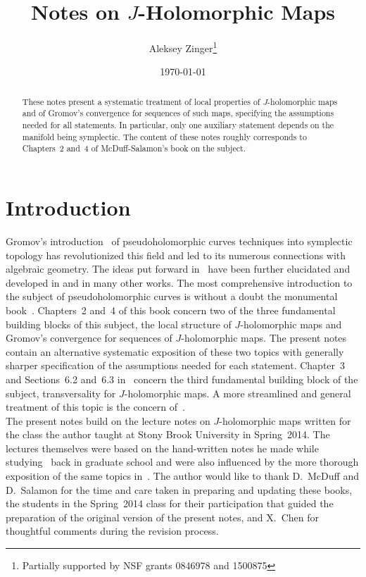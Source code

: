 \documentclass[11pt]{article}
\numberwithin{equation}{section}
\theoremstyle{definition}
\begin{document}
\title{Notes on $J$-Holomorphic Maps}
\author{Aleksey Zinger\thanks{Partially supported 
by NSF grants 0846978 and 1500875}}

\date{\today}

\maketitle

\begin{abstract}
\noindent
These notes present a systematic treatment of local properties of $J$-holomorphic maps
and of Gromov's convergence for sequences of such maps,
specifying the assumptions needed for all statements.
In particular, only one auxiliary statement depends on the manifold being symplectic. 
The content of these notes roughly corresponds to Chapters~2 and~4
of McDuff-Salamon's book on the subject.
\end{abstract}


\tableofcontents



\section{Introduction}
\label{intro_sec}

\noindent
Gromov's introduction~\cite{Gr} of pseudoholomorphic curves techniques into symplectic topology
has revolutionized this field and led to its numerous connections with algebraic geometry.
The ideas put forward in~\cite{Gr} have been further elucidated and developed
in \cite{Pansu,Ye,MS94,RT,RT2,LT} and in many other works.
The most comprehensive introduction to the subject of pseudoholomorphic curves
is without a doubt the monumental book~\cite{MS12}.
Chapters~2 and~4 of this book concern two of the three fundamental building blocks 
of this subject, the local structure of $J$-holomorphic maps and 
Gromov's convergence for sequences of $J$-holomorphic maps.
The present notes contain an alternative systematic exposition of these two topics
with generally sharper specification of the assumptions needed for each statement.
Chapter~3 and Sections~6.2 and~6.3 in~\cite{MS12} concern the third fundamental building block
of the subject, transversality for $J$-holomorphic maps.
A more streamlined and general treatment of this topic is the concern of~\cite{CmplRT}.\\


\noindent
The present notes build on the lecture notes on $J$-holomorphic maps
written for the class the author taught at Stony Brook University in Spring~2014.
The lectures themselves were based on the hand-written notes he made while
studying~\cite{MS94} back in graduate school and 
were also influenced by the more thorough exposition of the same topics in~\cite{MS12}.
The author would like to thank D.~McDuff and D.~Salamon for the time and care taken
in preparing and updating these books,
the students in the Spring~2014 class for their participation that
guided the preparation of the original version of the present notes, and
X.~Chen for thoughtful comments during the revision process.
\end{document}
